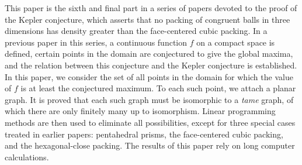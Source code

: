 This paper is the sixth and final part in a series of papers devoted
to the proof of the Kepler conjecture, which asserts that no packing
of congruent balls in three dimensions has density greater than the
face-centered cubic packing. In a previous paper in this series, a
continuous function $f$ on a compact space is defined, certain
points in the domain are conjectured to give the global maxima, and
the relation between this conjecture and the Kepler conjecture is
established. In this paper, we consider the set of all points in the
domain for which the value of $f$ is at least the conjectured
maximum.  To each such point, we attach a planar graph. It is proved
that each such graph must be isomorphic to a {\it tame} graph, of
which there are only finitely many up to isomorphism. Linear
programming methods are then used to eliminate all possibilities,
except for three special cases treated in earlier papers:
pentahedral prisms, the face-centered cubic packing, and the
hexagonal-close packing.  The results of this paper rely on long
computer calculations.
